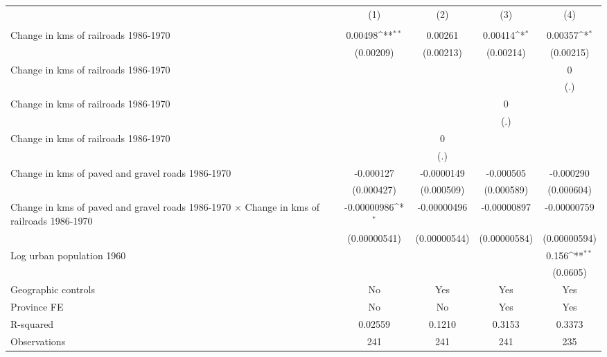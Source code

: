 {
\def\sym#1{\ifmmode^{#1}\else\(^{#1}\)\fi}
\begin{tabular}{l*{4}{c}}
\hline\hline
                &\multicolumn{1}{c}{(1)}&\multicolumn{1}{c}{(2)}&\multicolumn{1}{c}{(3)}&\multicolumn{1}{c}{(4)}\\
                &\multicolumn{1}{c}{}&\multicolumn{1}{c}{}&\multicolumn{1}{c}{}&\multicolumn{1}{c}{}\\
\hline
Change in kms of railroads 1986-1970&  0.00498\sym{**} &  0.00261         &  0.00414\sym{*}  &  0.00357\sym{*}  \\
                &(0.00209)         &(0.00213)         &(0.00214)         &(0.00215)         \\
[1em]
Change in kms of railroads 1986-1970&                  &                  &                  &        0         \\
                &                  &                  &                  &      (.)         \\
[1em]
Change in kms of railroads 1986-1970&                  &                  &        0         &                  \\
                &                  &                  &      (.)         &                  \\
[1em]
Change in kms of railroads 1986-1970&                  &        0         &                  &                  \\
                &                  &      (.)         &                  &                  \\
[1em]
Change in kms of paved and gravel roads 1986-1970&-0.000127         &-0.0000149         &-0.000505         &-0.000290         \\
                &(0.000427)         &(0.000509)         &(0.000589)         &(0.000604)         \\
[1em]
Change in kms of paved and gravel roads 1986-1970 $\times$ Change in kms of railroads 1986-1970&-0.00000986\sym{*}  &-0.00000496         &-0.00000897         &-0.00000759         \\
                &(0.00000541)         &(0.00000544)         &(0.00000584)         &(0.00000594)         \\
[1em]
Log urban population 1960&                  &                  &                  &    0.156\sym{**} \\
                &                  &                  &                  & (0.0605)         \\
\hline
Geographic controls&       No         &      Yes         &      Yes         &      Yes         \\
Province FE     &       No         &       No         &      Yes         &      Yes         \\
R-squared       &  0.02559         &   0.1210         &   0.3153         &   0.3373         \\
Observations    &      241         &      241         &      241         &      235         \\
\hline\hline
\end{tabular}
}
